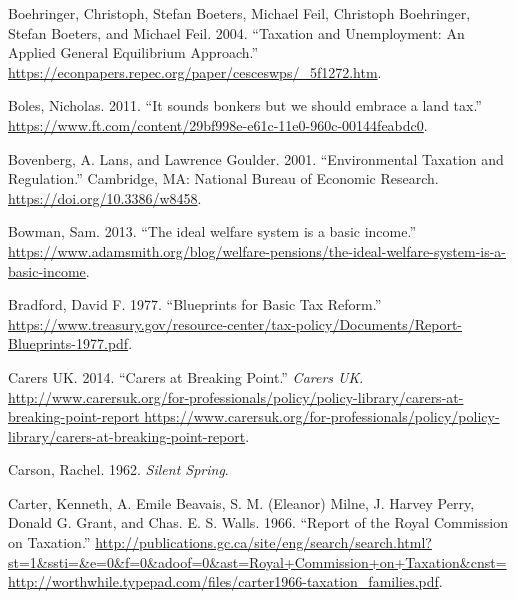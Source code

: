 \documentclass[]{tufte-handout}
\begin{document}
\leavevmode\hypertarget{ref-Boehringer2004}{}%
Boehringer, Christoph, Stefan Boeters, Michael Feil, Christoph
Boehringer, Stefan Boeters, and Michael Feil. 2004. ``Taxation and
Unemployment: An Applied General Equilibrium Approach.''
\url{https://econpapers.repec.org/paper/cesceswps/_5f1272.htm}.

\leavevmode\hypertarget{ref-Boles}{}%
Boles, Nicholas. 2011. ``It sounds bonkers but we should embrace a land
tax.''
\url{https://www.ft.com/content/29bf998e-e61c-11e0-960c-00144feabdc0}.

\leavevmode\hypertarget{ref-Bovenberg2001}{}%
Bovenberg, A. Lans, and Lawrence Goulder. 2001. ``Environmental Taxation
and Regulation.'' Cambridge, MA: National Bureau of Economic Research.
\url{https://doi.org/10.3386/w8458}.

\leavevmode\hypertarget{ref-SamBowman2013}{}%
Bowman, Sam. 2013. ``The ideal welfare system is a basic income.''
\url{https://www.adamsmith.org/blog/welfare-pensions/the-ideal-welfare-system-is-a-basic-income}.

\leavevmode\hypertarget{ref-Bradford1977}{}%
Bradford, David F. 1977. ``Blueprints for Basic Tax Reform.''
\url{https://www.treasury.gov/resource-center/tax-policy/Documents/Report-Blueprints-1977.pdf}.

\leavevmode\hypertarget{ref-CarersUK2014}{}%
Carers UK. 2014. ``Carers at Breaking Point.'' \emph{Carers UK}.
\href{http://www.carersuk.org/for-professionals/policy/policy-library/carers-at-breaking-point-report\%20https://www.carersuk.org/for-professionals/policy/policy-library/carers-at-breaking-point-report}{http://www.carersuk.org/for-professionals/policy/policy-library/carers-at-breaking-point-report https://www.carersuk.org/for-professionals/policy/policy-library/carers-at-breaking-point-report}.

\leavevmode\hypertarget{ref-Carson1962}{}%
Carson, Rachel. 1962. \emph{Silent Spring}.

\leavevmode\hypertarget{ref-Carter1966}{}%
Carter, Kenneth, A. Emile Beavais, S. M. (Eleanor) Milne, J. Harvey
Perry, Donald G. Grant, and Chas. E. S. Walls. 1966. ``Report of the
Royal Commission on Taxation.''
\href{http://publications.gc.ca/site/eng/search/search.html?st=1\&ssti=\&e=0\&f=0\&adoof=0\&ast=Royal+Commission+on+Taxation\&cnst=\%20http://worthwhile.typepad.com/files/carter1966-taxation_families.pdf}{http://publications.gc.ca/site/eng/search/search.html?st=1\&ssti=\&e=0\&f=0\&adoof=0\&ast=Royal+Commission+on+Taxation\&cnst= http://worthwhile.typepad.com/files/carter1966-taxation\_families.pdf}.
\end{document}
